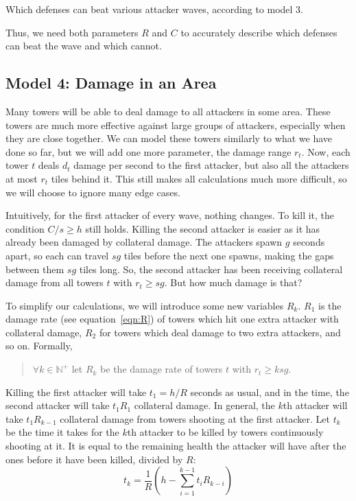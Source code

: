 \begin{center}
\begin{minipage}{.33\textwidth}
        \label{fig:model-3-n12}
    \end{minipage}%
    \caption{Which defenses can beat various attacker waves, according to model 3.}
    \label{fig:model3}
\end{center}

Thus, we need both parameters $R$ and $C$ to accurately describe which defenses can beat the wave and which cannot.

\subsection{Model 4: Damage in an Area}\label{sec:analysis-waves-aoe}
Many towers will be able to deal damage to all attackers in some area.
These towers are much more effective against large groups of attackers, especially when they are close together.
We can model these towers similarly to what we have done so far, but we will add one more parameter, the damage range $r_t$.
Now, each tower $t$ deals $d_t$ damage per second to the first attacker, but also all the attackers at most $r_t$ tiles behind it.
This still makes all calculations much more difficult, so we will choose to ignore many edge cases.

Intuitively, for the first attacker of every wave, nothing changes.
To kill it, the condition $C/s \geq h$ still holds.
Killing the second attacker is easier as it has already been damaged by collateral damage.
The attackers spawn $g$ seconds apart, so each can travel $sg$ tiles before the next one spawns, making the gaps between them $sg$ tiles long.
So, the second attacker has been receiving collateral damage from all towers $t$ with $r_t \geq sg$.
But how much damage is that?

To simplify our calculations, we will introduce some new variables $R_k$.
$R_1$ is the damage rate (see equation~\ref{eqn:R}) of towers which hit one extra attacker with collateral damage, $R_2$ for towers which deal damage to two extra attackers, and so on.
Formally,
\begin{quotation}
    $\forall k \in \mathbb{N}^+$ let $R_k$ be the damage rate of towers $t$ with $r_t \geq ksg$.
\end{quotation}

Killing the first attacker will take $t_1 = h/R$ seconds as usual, and in the time, the second attacker will take $t_1 R_1$ collateral damage.
In general, the $k$th attacker will take $t_1 R_{k-1}$ collateral damage from towers shooting at the first attacker.
Let $t_k$ be the time it takes for the $k$th attacker to be killed by towers continuously shooting at it.
It is equal to the remaining health the attacker will have after the ones before it have been killed, divided by $R$:
\begin{equation}\label{eqn:time-to-kill}
    t_k = \frac{1}{R}\left(h - \sum_{i=1}^{k-1} t_i R_{k-i} \right)
\end{equation}

